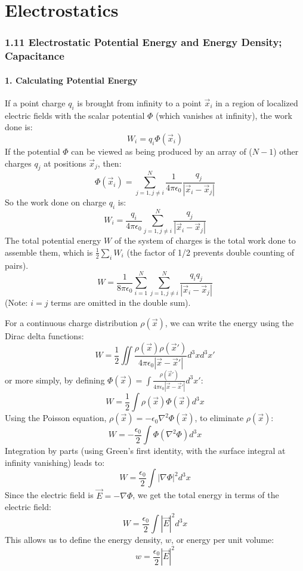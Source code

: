 \documentclass[12pt, a4paper]{article}
\begin{document}
	\part{Electrostatics}
	
	\section{1.11 Electrostatic Potential Energy and Energy Density; Capacitance}
	
	\subsection*{1. Calculating Potential Energy}
	
	If a point charge $q_i$ is brought from infinity to a point $\vec{x}_i$ in a region of localized electric fields with the scalar potential $\Phi$ (which vanishes at infinity), the work done is:
	$$
	W_i = q_i \Phi(\vec{x}_i)
	$$
	If the potential $\Phi$ can be viewed as being produced by an array of ($N-1$) other charges $q_j$ at positions $\vec{x}_j$, then:
	$$
	\Phi(\vec{x}_i) = \sum_{j=1, j\neq i}^{N} \frac{1}{4\pi\epsilon_0} \frac{q_j}{|\vec{x}_i - \vec{x}_j|}
	$$
	So the work done on charge $q_i$ is:
	$$
	W_i = \frac{q_i}{4\pi\epsilon_0} \sum_{j=1, j\neq i}^{N} \frac{q_j}{|\vec{x}_i - \vec{x}_j|}
	$$
	The total potential energy $W$ of the system of charges is the total work done to assemble them, which is $\frac{1}{2}\sum_i W_i$ (the factor of 1/2 prevents double counting of pairs).
	$$
	W = \frac{1}{8\pi\epsilon_0} \sum_{i=1}^{N} \sum_{j=1, j\neq i}^{N} \frac{q_i q_j}{|\vec{x}_i - \vec{x}_j|}
	$$
	(Note: $i=j$ terms are omitted in the double sum).
	
	For a continuous charge distribution $\rho(\vec{x})$, we can write the energy using the Dirac delta functions:
	$$
	W = \frac{1}{2} \iint \frac{\rho(\vec{x})\rho(\vec{x}')}{4\pi\epsilon_0|\vec{x}-\vec{x}'|} d^3x d^3x'
	$$
	or more simply, by defining $\Phi(\vec{x}) = \int \frac{\rho(\vec{x}')}{4\pi\epsilon_0|\vec{x}-\vec{x}'|}d^3x'$:
	$$
	W = \frac{1}{2} \int \rho(\vec{x}) \Phi(\vec{x}) d^3x
	$$
	Using the Poisson equation, $\rho(\vec{x}) = -\epsilon_0 \nabla^2 \Phi(\vec{x})$, to eliminate $\rho(\vec{x})$:
	$$
	W = -\frac{\epsilon_0}{2} \int \Phi (\nabla^2 \Phi) d^3x
	$$
	Integration by parts (using Green's first identity, with the surface integral at infinity vanishing) leads to:
	$$
	W = \frac{\epsilon_0}{2} \int |\nabla\Phi|^2 d^3x
	$$
	Since the electric field is $\vec{E} = -\nabla\Phi$, we get the total energy in terms of the electric field:
	$$
	W = \frac{\epsilon_0}{2} \int |\vec{E}|^2 d^3x
	$$
	This allows us to define the energy density, $w$, or energy per unit volume:
	$$
	w = \frac{\epsilon_0}{2} |\vec{E}|^2
	$$
	
\end{document}
